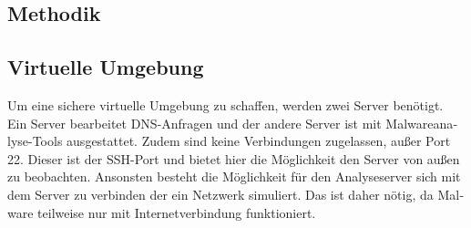 \begin{otherlanguage}{ngerman}
\section{Methodik}
\subsection{Virtuelle Umgebung}\label{Praktisches Terraform}
Um eine sichere virtuelle Umgebung zu schaffen, werden zwei Server benötigt. Ein Server bearbeitet DNS-Anfragen und der andere Server ist mit Malwareanalyse-Tools ausgestattet. Zudem sind keine Verbindungen zugelassen, außer Port 22. Dieser ist der SSH-Port und bietet hier die Möglichkeit den Server von außen zu beobachten. Ansonsten besteht die Möglichkeit für den Analyseserver sich mit dem Server zu verbinden der ein Netzwerk simuliert. Das ist daher nötig, da Malware teilweise nur mit Internetverbindung funktioniert. 

\end{otherlanguage}
